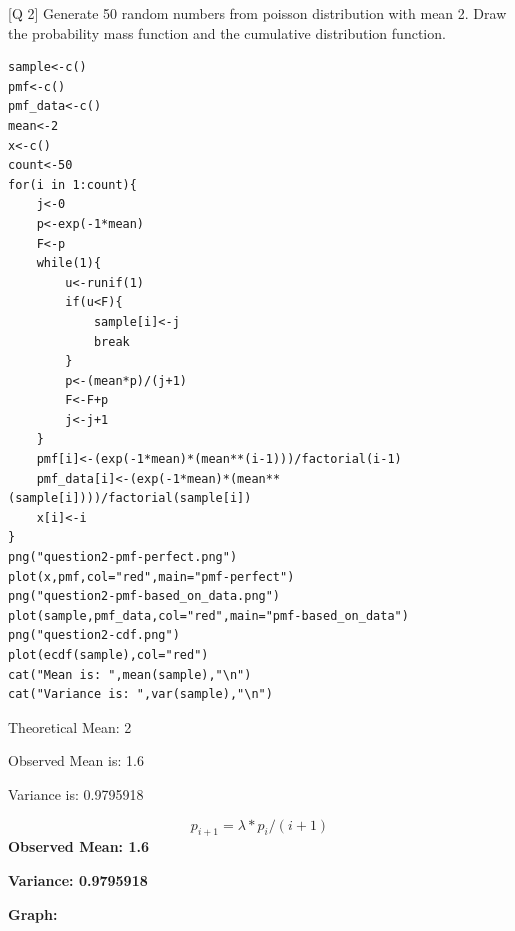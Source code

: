\documentclass[11pt]{article}
\begin{document}
[Q 2] Generate 50 random numbers from poisson distribution with mean 2. Draw the probability
mass function and the cumulative distribution function.

\begin{lstlisting}
sample<-c()
pmf<-c()
pmf_data<-c()
mean<-2
x<-c()
count<-50
for(i in 1:count){
	j<-0
	p<-exp(-1*mean)
	F<-p
	while(1){
		u<-runif(1)
		if(u<F){
			sample[i]<-j
			break
		}
		p<-(mean*p)/(j+1)
		F<-F+p
		j<-j+1
	}
	pmf[i]<-(exp(-1*mean)*(mean**(i-1)))/factorial(i-1)
	pmf_data[i]<-(exp(-1*mean)*(mean**(sample[i])))/factorial(sample[i])
	x[i]<-i
}
png("question2-pmf-perfect.png")
plot(x,pmf,col="red",main="pmf-perfect")
png("question2-pmf-based_on_data.png")
plot(sample,pmf_data,col="red",main="pmf-based_on_data")
png("question2-cdf.png")
plot(ecdf(sample),col="red")
cat("Mean is: ",mean(sample),"\n")
cat("Variance is: ",var(sample),"\n")
\end{lstlisting}

Theoretical Mean: 2\

Observed Mean is:  1.6\

Variance is:  0.9795918\

	\begin{equation}
	p_{i+1} =λ*p_i/(i+1) 
	\end{equation}
	\textbf{Observed Mean: 1.6}\

	\textbf{Variance: 0.9795918}\

	\textbf{Graph: }\
\end{document}
